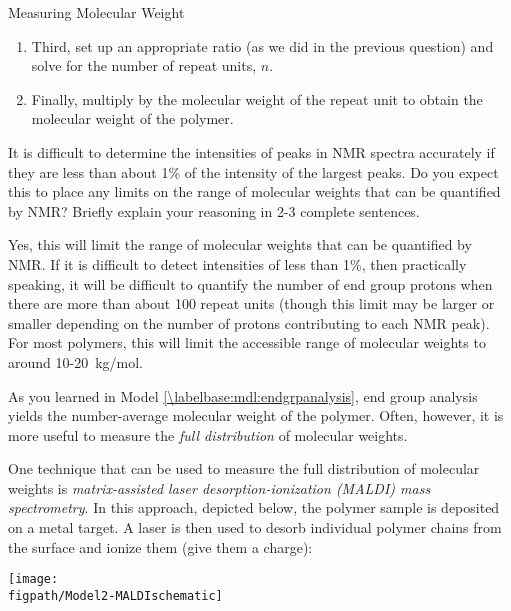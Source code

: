 \begin{activity}{Measuring Molecular Weight}
\begin{ctqs}
\begin{solution}[2in]{}
\begin{enumerate}
					\item Third, set up an appropriate ratio (as we did in the previous question) and solve for the number of repeat units, $n$.
				
					\item Finally, multiply by the molecular weight of the repeat unit to obtain the molecular weight of the polymer.
				\end{enumerate}
				 
			\end{solution}
		
		\question It is difficult to determine the intensities of peaks in NMR spectra accurately if they are less than about 1\% of the intensity of the largest peaks.  Do you expect this to place any limits on the range of molecular weights that can be quantified by NMR?  Briefly explain your reasoning in 2-3 complete sentences.
		
			\begin{solution}[2in]{}
				Yes, this will limit the range of molecular weights that can be quantified by NMR.  If it is difficult to detect intensities of less than 1\%, then practically speaking, it will be difficult to quantify the number of end group protons when there are more than about 100 repeat units (though this limit may be larger or smaller depending on the number of protons contributing to each NMR peak).  For most polymers, this will limit the accessible range of molecular weights to around 10-20~kg/mol.
			\end{solution}
	
\end{ctqs}



\begin{model}
	\label{\labelbase:mdl:MALDI}

	As you learned in Model \ref{\labelbase:mdl:endgrpanalysis}, end group analysis yields the number-average molecular weight of the polymer.  Often, however, it is more useful to measure the \emph{full distribution} of molecular weights.
	
	One technique that can be used to measure the full distribution of molecular weights is \emph{matrix-assisted laser desorption-ionization (MALDI) mass spectrometry}.  In this approach, depicted below, the polymer sample is deposited on a metal target.  A laser is then used to desorb individual polymer chains from the surface and ionize them (give them a charge):   
	
	\vspace{12pt}
	\centerline{\texttt{[image: \\figpath/Model2-MALDIschematic]}}
	

\end{model}
\end{activity}
